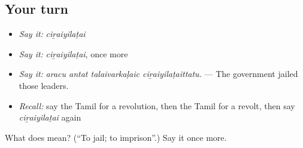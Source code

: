 \subsection*{Your turn}
\begin{itemize}
\raggedright
  \item \emph{Say it:} \emph{ciṟaiyilaṭai}
  \item \emph{Say it:} \emph{ciṟaiyilaṭai}, once more
  \item \emph{Say it:} \emph{aracu antat talaivarkaḷaic ciṟaiyilaṭaittatu.} — The government jailed those leaders.
  \item \emph{Recall:} say the Tamil for a revolution, then the Tamil for a revolt, then say \emph{ciṟaiyilaṭai} again
\end{itemize}

\begin{tcolorbox}[breakable,colback=teal!4,colframe=teal!35!black,title={Before you move on}]
What does  mean? (\textquotedblleft{}To jail; to imprison\textquotedblright{}.) Say it once more.
\end{tcolorbox}
